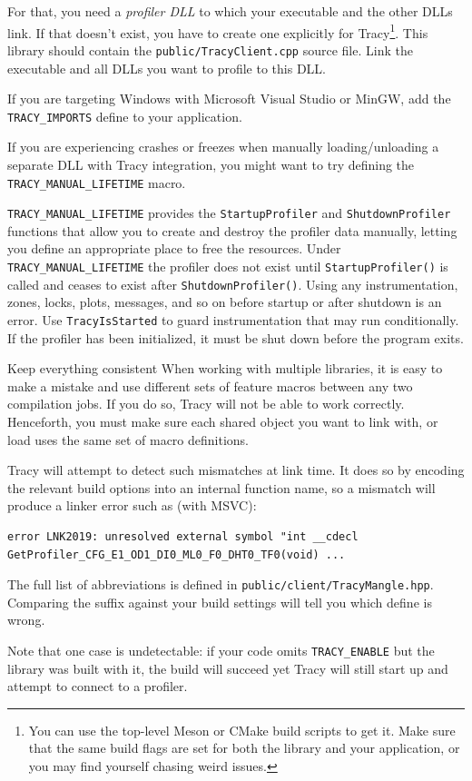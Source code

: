 \documentclass[hidelinks,titlepage,a4paper,twoside]{article}
\begin{document}
For that, you need a \emph{profiler DLL} to which your executable and the other DLLs link. If that doesn't exist, you have to create one explicitly for Tracy\footnote{You can use the top-level Meson or CMake build scripts to get it. Make sure that the same build flags are set for both the library and your application, or you may find yourself chasing weird issues.}. This library should contain the \texttt{public/TracyClient.cpp} source file. Link the executable and all DLLs you want to profile to this DLL.

If you are targeting Windows with Microsoft Visual Studio or MinGW, add the \texttt{TRACY\_IMPORTS} define to your application.

If you are experiencing crashes or freezes when manually loading/unloading a separate DLL with Tracy integration, you might want to try defining the \texttt{TRACY\_MANUAL\_LIFETIME} macro.

\texttt{TRACY\_MANUAL\_LIFETIME} provides the \texttt{StartupProfiler} and \texttt{ShutdownProfiler} functions that allow you to create and destroy the profiler data manually, letting you define an appropriate place to free the resources. Under \texttt{TRACY\_MANUAL\_LIFETIME} the profiler does not exist until \texttt{StartupProfiler()} is called and ceases to exist after \texttt{ShutdownProfiler()}. Using any instrumentation, zones, locks, plots, messages, and so on before startup or after shutdown is an error. Use \texttt{TracyIsStarted} to guard instrumentation that may run conditionally. If the profiler has been initialized, it must be shut down before the program exits.

\begin{bclogo}[
noborder=true,
couleur=black!5,
logo=\bcbombe
]{Keep everything consistent}
When working with multiple libraries, it is easy to make a mistake and use different sets of feature macros between any two compilation jobs. If you do so, Tracy will not be able to work correctly. Henceforth, you must make sure each shared object you want to link with, or load uses the same set of macro definitions.

Tracy will attempt to detect such mismatches at link time. It does so by encoding the relevant build options into an internal function name, so a mismatch will produce a linker error such as (with MSVC):

\begin{lstlisting}
error LNK2019: unresolved external symbol "int __cdecl GetProfiler_CFG_E1_OD1_DI0_ML0_F0_DHT0_TF0(void) ...
\end{lstlisting}

The full list of abbreviations is defined in \texttt{public/client/TracyMangle.hpp}. Comparing the suffix against your build settings will tell you which define is wrong.

Note that one case is undetectable: if your code omits \texttt{TRACY\_ENABLE} but the library was built with it, the build will succeed yet Tracy will still start up and attempt to connect to a profiler.
\end{bclogo}
\end{document}
